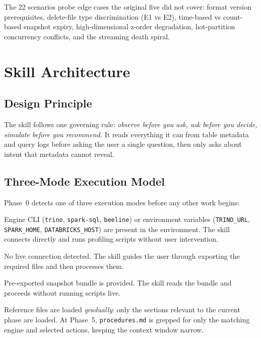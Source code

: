 \documentclass[11pt,a4paper]{article}
\newcommand{\code}[1]{\texttt{#1}}
\begin{document}
The 22 scenarios probe edge cases the original five did not cover: format
version prerequisites, delete-file type discrimination (E1 vs E2), time-based
vs count-based snapshot expiry, high-dimensional z-order degradation,
hot-partition concurrency conflicts, and the streaming death spiral.

\section{Skill Architecture}

\subsection{Design Principle}

The skill follows one governing rule:
\emph{observe before you ask, ask before you decide, simulate before you
recommend.}  It reads everything it can from table metadata and query logs
before asking the user a single question, then only asks about intent that
metadata cannot reveal.

\subsection{Three-Mode Execution Model}

Phase~0 detects one of three execution modes before any other work begins:

\begin{description}[leftmargin=2.5em,labelwidth=2em]
  \item[Direct]   Engine CLI (\code{trino}, \code{spark-sql}, \code{beeline})
        or environment variables (\code{TRINO\_URL}, \code{SPARK\_HOME},
        \code{DATABRICKS\_HOST}) are present in the environment.  The skill
        connects directly and runs profiling scripts without user intervention.
  \item[Ask-User] No live connection detected.  The skill guides the user
        through exporting the required files and then processes them.
  \item[Exported] Pre-exported snapshot bundle is provided.  The skill reads
        the bundle and proceeds without running scripts live.
\end{description}

Reference files are loaded \emph{gradually}: only the sections relevant to the
current phase are loaded.  At Phase~5, \code{procedures.md} is grepped for
only the matching engine and selected actions, keeping the context window narrow.
\end{document}
